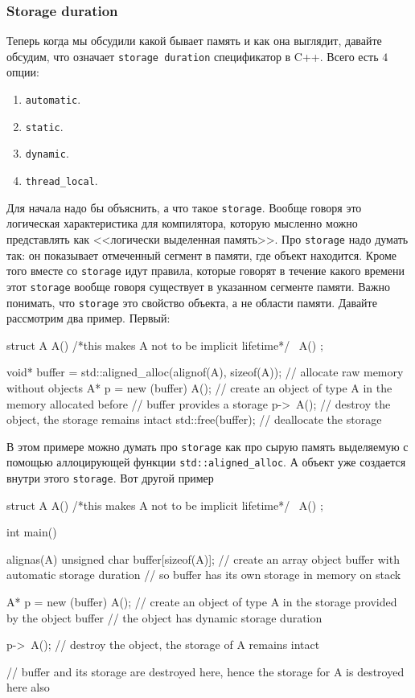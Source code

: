 \documentclass{article}
\begin{document}
\subsubsection{Storage duration}

Теперь когда мы обсудили какой бывает память и как она выглядит, давайте обсудим, что означает \verb"storage duration" спецификатор в C++.
Всего есть $4$ опции:
\begin{enumerate}
\item \verb"automatic".

\item \verb"static".

\item \verb"dynamic".

\item \verb"thread_local".
\end{enumerate}
Для начала надо бы объяснить, а что такое \verb"storage".
Вообще говоря это логическая характеристика для компилятора, которую мысленно можно представлять как <<логически выделенная память>>.
Про \verb"storage" надо думать так: он показывает отмеченный сегмент в памяти, где объект находится.
Кроме того вместе со \verb"storage" идут правила, которые говорят в течение какого времени этот \verb"storage" вообще говоря существует в указанном сегменте памяти.
Важно понимать, что \verb"storage" это свойство объекта, а не области памяти.
Давайте рассмотрим два пример.
Первый:
\begin{cppcode}
struct A {
  A() {
    /*this makes A not to be implicit lifetime*/
  }
  ~A() {}
};

void* buffer = std::aligned_alloc(alignof(A), sizeof(A)); // allocate raw memory without objects
A* p = new (buffer) A(); // create an object of type A in the memory allocated before
                         // buffer provides a storage
p->~A();                 // destroy the object, the storage remains intact
std::free(buffer);       // deallocate the storage
\end{cppcode}
В этом примере можно думать про \verb"storage" как про сырую память выделяемую с помощью аллоцирующей функции \verb"std::aligned_alloc".
А объект уже создается внутри этого \verb"storage".
Вот другой пример
\begin{cppcode}
struct A {
  A() {
    /*this makes A not to be implicit lifetime*/
  }
  ~A() {}
};

int main() {
  alignas(A) unsigned char buffer[sizeof(A)];
  // create an array object buffer with automatic storage duration
  // so buffer has its own storage in memory on stack
  
  A* p = new (buffer) A();
  // create an object of type A in the storage provided by the object buffer
  // the object has dynamic storage duration
  
  p->~A();
  // destroy the object, the storage of A remains intact
  
} // buffer and its storage are destroyed here, hence the storage for A is destroyed here also
\end{cppcode}
\end{document}
